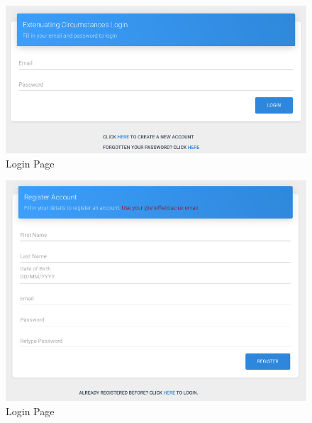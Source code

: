 \documentclass[../main.tex]{subfiles}
\begin{document}
\begin{center}
 \begin{figure}[H]
        \includegraphics[scale=1]
        {images/login.png}
        \caption{\label{fig:login} Login Page}
      \end{figure} 

\begin{figure}[H]
        \includegraphics[scale=1]
        {images/register.png}
        \caption{\label{fig:register} Login Page}
      \end{figure}
 \end{center} 
\end{document}
